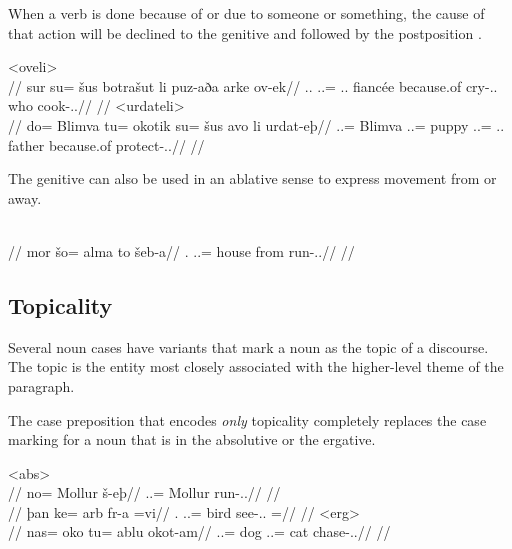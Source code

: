 When a verb is done because of or due to someone or something, the cause of that action will be declined to the genitive and followed by the postposition   .

	\a<oveli>\begingl
		\glpreamble{}\\
		//
		\gla sur su= šus botrašut li puz-aða arke ov-ek//
		\glb \Tps.\An.\Abs{} \An.\Sg.\Gen= \Tps.\An.\Gen{} fiancée because.of cry-\Ind.\Pst.\Prg{} who cook-\Ind.\Pst.\Pfv//
		\glft{}//
	\endgl
	\a<urdateli>\begingl
		\glpreamble{}\\
		//
		\gla do= Blimva tu= okotik su= šus avo li urdat-eþ//
		\glb \An.\Sg.\Erg= Blimva \An.\Sg.\Acc= puppy \An.\Sg.\Gen= \Tps.\An.\Gen{} father because.of protect-\Ind.\Npst.\Prg//
		\glft{}//
	\endgl
\xe

The genitive can also be used in an ablative sense to express movement from or away.

	\begingl
		\glpreamble{}\\
		//
		\gla mor šo= alma to šeb-a//
		\glb \Fps.\An{} \In.\Sg.\Gen= house from run-\Ind.\Npst.\Ipfv//
		\glft{}//
	\endgl
\xe

\subsection{Topicality}
\label{subsec:tvk-nouns-topicality}

Several noun cases have variants that mark a noun as the topic of a discourse. The topic is the entity most closely associated with the higher-level theme of the paragraph.

The case preposition that encodes \textit{only} topicality completely replaces the case marking for a noun that is in the absolutive or the ergative.

	\a<abs>\begingl
		\glpreamble{}\\
		//
		\gla no= Mollur š-eþ//
		\glb \An.\Sg.\Top= Mollur run-\Ind.\Npst.\Prg//
		\glft{}//
	\endgl
	\a<abs-tr>\begingl
		\glpreamble{}\\
		//
		\gla þan ke= arb fr-a =vi//
		\glb \Sps.\Top{} \An.\Sg.\Dat= bird see-\Ind.\Npst.\Ipfv{} =\Int//
		\glft{}//
	\endgl
	\a<erg>\begingl
		\glpreamble{}\\
		//
		\gla nas= oko tu= ablu okot-am//
		\glb \An.\Pc.\Top= dog \An.\Sg.\Acc= cat chase-\Ind.\Pst.\Ipfv//
		\glft{}//
	\endgl
\xe


